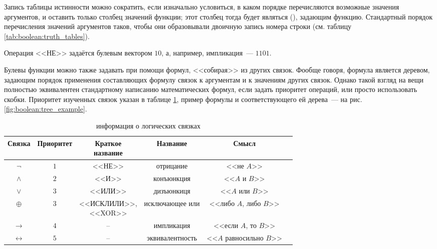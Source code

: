 
Запись таблицы истинности можно сократить, если изначально условиться, в каком порядке перечисляются возможные значения аргументов, и оставить только столбец значений функции;
этот столбец тогда будет являться  (), задающим функцию.
Стандартный порядок перечисления значений аргументов таков, чтобы они образовывали двоичную запись номера строки (см. таблицу \ref{tab:boolean:truth_tables}).

\begin{example}
    Операция <<НЕ>> задаётся булевым вектором $ 10 $, а, например, импликация~--- $ 1101 $.
\end{example}

Булевы функции можно также задавать при помощи формул, <<собирая>> из других связок.
Фообще говоря, формула является деревом, задающим порядок применения составляющих формулу связок к аргументам и к значениям других связок.
Однако такой взгляд на вещи полностью эквивалентен стандартному написанию математических формул, если задать приоритет операций, или просто использовать скобки.
Приоритет изученных связок указан в таблице \ref{tab:boolean:full_info}, пример формулы и соответствующего ей дерева~--- на рис. \ref{fig:boolean:tree_example}.

\begin{table}[ht!]
    \center
    \begin{tabular}{|c|c|c|c|c|c|}
        \hline
        Связка               & Приоритет & \makecell{Краткое \\ название}     & Название        & Смысл                       \\
        \hline
        \hline
        $ \neg $             & $ 1 $     & <<НЕ>>                             & отрицание       & <<не $ A $>>                \\
        $ \wedge $           & $ 2 $     & <<И>>                              & конъюнкция      & <<$ A $ и $ B $>>           \\
        $ \vee $             & $ 3 $     & <<ИЛИ>>                            & дизъюнкиця      & <<$ A $ или $ B $>>         \\
        $ \oplus $           & $ 3 $     & \makecell{<<ИСКЛИЛИ>>, \\ <<XOR>>} & исключающее или & <<либо $ A $, либо $ B $>>  \\
        $ \rightarrow $      & $ 4 $     & --                                 & импликация      & <<если $ A $, то $ B $>>    \\
        $ \leftrightarrow $  & $ 5 $     & --                                 & эквивалентность & <<$ A $ равносильно $ B $>> \\
        \hline
    \end{tabular}
    \caption{информация о логических связках}
    \label{tab:boolean:full_info}
\end{table}


